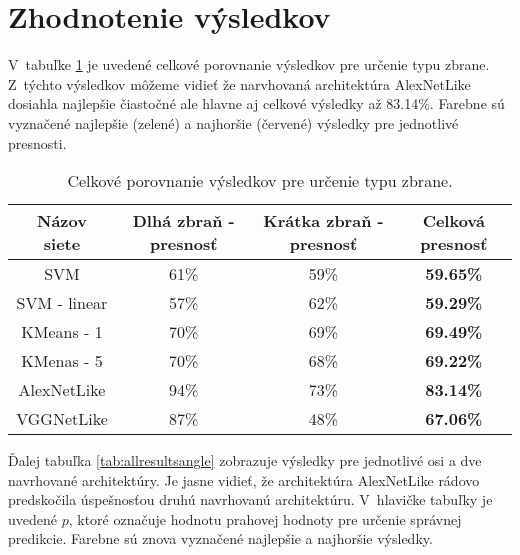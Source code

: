 
\section{Zhodnotenie výsledkov}
V~tabuľke \ref{tab:allresultsclass} je uvedené celkové porovnanie výsledkov pre určenie typu zbrane.
Z~týchto výsledkov môžeme vidieť že narvhovaná architektúra AlexNetLike dosiahla najlepšie čiastočné ale hlavne aj celkové výsledky až 83.14\%.
Farebne sú vyznačené najlepšie (zelené) a najhoršie (červené) výsledky pre jednotlivé presnosti.

\begin{table}[H]
    \centering
    \begin{tabular}{|c|c|c|c|}
        \hline
        Názov siete  & Dlhá zbraň - presnosť       & Krátka zbraň - presnosť     & Celková presnosť                        \\ \hline
        SVM          & 61\%                        & {\color[HTML]{9A0000} 59\%} & \textbf{59.65\%}                        \\ %
        SVM - linear & {\color[HTML]{9A0000} 57\%} & 62\%                        & {\color[HTML]{9A0000} \textbf{59.29\%}} \\ \hline
        KMeans - 1   & 70\%                        & 69\%                        & \textbf{69.49\%}                        \\ %
        KMenas - 5   & 70\%                        & 68\%                        & \textbf{69.22\%}                        \\ \hline
        AlexNetLike  & {\color[HTML]{009901} 94\%} & {\color[HTML]{009901} 73\%} & {\color[HTML]{009901} \textbf{83.14\%}} \\ %
        VGGNetLike   & 87\%                        & 48\%                        & \textbf{67.06\%}                        \\ \hline
    \end{tabular}
    \caption{Celkové porovnanie výsledkov pre určenie typu zbrane.}
    \label{tab:allresultsclass}
\end{table}

Ďalej tabuľka \ref{tab:allresultsangle} zobrazuje výsledky pre jednotlivé osi a dve navrhované architektúry.
Je jasne vidieť, že architektúra AlexNetLike rádovo predskočila úspešnosťou druhú navrhovanú architektúru.
V~hlavičke tabuľky je uvedené $p$, ktoré označuje hodnotu prahovej hodnoty pre určenie správnej predikcie.
Farebne sú znova vyznačené najlepšie a najhoršie výsledky.

